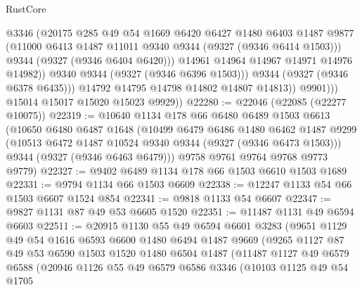 \begin{lexlean}{RustCore}
\begin{coremodule}
                          @3346
                          (@20175
                            @285
                            @49
                            @54
                            @1669
                            @6420
                            @6427
                            @1480
                            @6403
                            @1487
                            @9877
                            (@11000 @6413 @1487 @11011 @9340 @9344 (@9327 (@9346 @6414 @1503)))
                            @9344
                            (@9327 (@9346 @6404 @6420)))
                          @14961
                          @14964
                          @14967
                          @14971
                          @14976
                          @14982))
                      @9340
                      @9344
                      (@9327 (@9346 @6396 @1503)))
                    @9344
                    (@9327 (@9346 @6378 @6435)))
                  @14792
                  @14795
                  @14798
                  @14802
                  @14807
                  @14813))
              @9901)))
        @15014
        @15017
        @15020
        @15023
        @9929))
@22280 := @22046 (@22085 (@22277 @10075))
@22319 := @10640
    @1134
    @178
    @66
    @6480
    @6489
    @1503
    @6613
    (@10650
      @6480
      @6487
      @1648
      (@10499
        @6479
        @6486
        @1480
        @6462
        @1487
        @9299
        (@10513 @6472 @1487 @10524 @9340 @9344 (@9327 (@9346 @6473 @1503)))
        @9344
        (@9327 (@9346 @6463 @6479)))
      @9758
      @9761
      @9764
      @9768
      @9773
      @9779)
@22327 := @9402 @6489 @1134 @178 @66 @1503 @6610 @1503 @1689
@22331 := @9794 @1134 @66 @1503 @6609
@22338 := @12247 @1133 @54 @66 @1503 @6607 @1524 @854
@22341 := @9818 @1133 @54 @6607
@22347 := @9827 @1131 @87 @49 @53 @6605 @1520
@22351 := @11487 @1131 @49 @6594 @6603
@22511 := @20915
    @1130
    @55
    @49
    @6594
    @6601
    @3283
    (@9651
      @1129
      @49
      @54
      @1616
      @6593
      @6600
      @1480
      @6494
      @1487
      @9669
      (@9265
        @1127
        @87
        @49
        @53
        @6590
        @1503
        @1520
        @1480
        @6504
        @1487
        (@11487
          @1127
          @49
          @6579
          @6588
          (@20946
            @1126
            @55
            @49
            @6579
            @6586
            @3346
            (@10103
              @1125
              @49
              @54
              @1705

\end{coremodule}
\end{lexlean}
